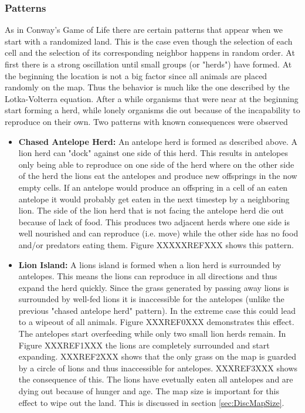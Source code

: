 \documentclass[11pt]{article}
\begin{document}
\subsubsection{Patterns}
\label{sec:patterns}
As in Conway's Game of Life there are certain patterns that appear when we start with a randomized land. This is the case even though the selection of each cell and the selection of its corresponding neighbor happens in random order.  At first there is a strong oscillation until small groups (or "herds") have formed. At the beginning the location is not a big factor since all animals are placed randomly on the map. Thus the behavior is much like the one described by the Lotka-Volterra equation. After a while organisms that were near at the beginning start forming a herd, while lonely organisms die out because of the incapability to reproduce on their own. 
Two patterns with known consequences were observed
\begin{itemize}
\item {\bf Chased Antelope Herd:} An antelope herd is formed as described above. A lion herd can "dock" against one side of this herd. This results in antelopes only being able to reproduce on one side of the herd where on the other side of the herd the lions eat the antelopes and produce new offsprings in the now empty cells. If an antelope would produce an offspring in a cell of an eaten antelope it would probably get eaten in the next timestep by a neighboring lion. The side of the lion herd that is not facing the antelope herd die out because of lack of food. This produces two adjacent herds where one side is well nourished and can reproduce (i.e. move) while the other side has no food and/or predators eating them. Figure XXXXXREFXXX shows this pattern.
\item {\bf Lion Island:} A lions island is formed when a lion herd is surrounded by antelopes. This means the lions can reproduce in all directions and thus expand the herd quickly. Since the grass generated by passing away lions is surrounded by well-fed lions it is inaccessible for the antelopes (unlike the previous "chased antelope herd" pattern). In the extreme case this could lead to a wipeout of all animals. Figure XXXREF0XXX demonstrates this effect. The antelopes start overfeeding while only two small lion herds remain. In Figure XXXREF1XXX the lions are completely surrounded and start expanding. XXXREF2XXX shows that the only grass on the map is guarded by a circle of lions and thus inaccessible for antelopes. XXXREF3XXX shows the consequence of this. The lions have evetually eaten all antelopes and are dying out because of hunger and age. The map size is important for this effect to wipe out the land. This is discussed in section \ref{sec:DiscMapSize}.
\end{itemize} 
\end{document}

